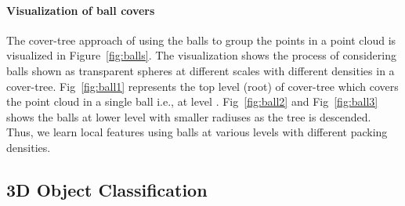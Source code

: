 \documentclass{article}
\begin{document}
\paragraph{Visualization of ball covers}
The cover-tree approach of using the balls to group the points in a point cloud is visualized in Figure~\ref{fig:balls}. The visualization shows the process of considering balls shown as transparent spheres at different scales with different densities in a cover-tree. Fig~\ref{fig:ball1} represents the top level (root) of cover-tree which covers the point cloud in a single ball i.e., at level . Fig~\ref{fig:ball2} and Fig~\ref{fig:ball3} shows the balls at lower level with smaller radiuses as the tree is descended. Thus, we learn local features using balls at various levels with different packing densities.



\subsection{3D Object Classification}
\end{document}
